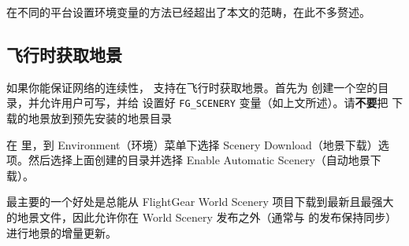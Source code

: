 \medskip
\ifchinese
在不同的平台设置环境变量的方法已经超出了本文的范畴，在此不多赘述。
\fi

\ifchinese
\subsection{飞行时获取地景}
\fi

\ifchinese
如果你能保证网络的连续性，\FlightGear{} 支持在飞行时获取地景。首先为 \TerraSync{} 创建一个空的目录，并允许用户可写，并给 \FlightGear{} 设置好 \texttt{FG\_SCENERY} 变量（如上文所述）。请\textbf{不要}把 \TerraSync{} 下载的地景放到预先安装的地景目录

在 \FlightGear{} 里，到 Environment（环境）菜单下选择 Scenery Download（地景下载）选项。然后选择上面创建的目录并选择 Enable Automatic Scenery（自动地景下载）。

\TerraSync{} 最主要的一个好处是总能从 FlightGear World Scenery 项目下载到最新且最强大的地景文件，因此允许你在 World Scenery 发布之外（通常与 \FlightGear{} 的发布保持同步）进行地景的增量更新。
\fi
%
%

